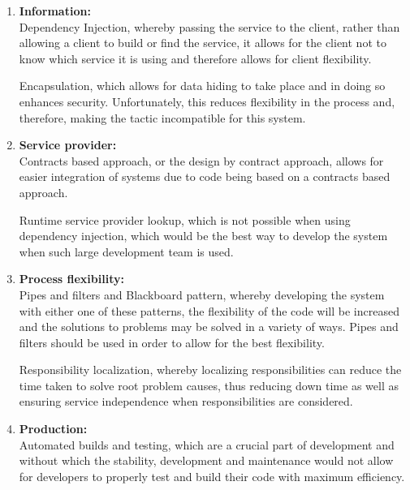 \documentclass{article}
\begin{document}
			\begin{enumerate}

				\item{\bfseries Information:}\\

				Dependency Injection, whereby passing the service to the client, rather than allowing a client to build or find the service, it allows for the client not to know which service it is using and therefore allows for client flexibility.

				Encapsulation, which allows for data hiding to take place and in doing so enhances security. Unfortunately, this reduces flexibility in the process and, therefore, making the tactic incompatible for this system. 

				\item{\bfseries Service provider:}\\

				Contracts based approach, or the design by contract approach, allows for easier integration of systems due to code being based on a contracts based approach.

				Runtime service provider lookup, which is not possible when using dependency injection, which would be the best way to develop the system when such large development team is used.

				\item{\bfseries Process flexibility:}\\

				Pipes and filters and Blackboard pattern, whereby developing the system with either one of these patterns, the flexibility of the code will be increased and the solutions to problems may be solved in a variety of ways. Pipes and filters should be used in order to allow for the best flexibility.

				Responsibility localization, whereby localizing responsibilities can reduce the time taken to solve root problem causes, thus reducing down time as well as ensuring service independence when responsibilities are considered.

				\item{\bfseries Production:}\\

				Automated builds and testing, which are a crucial part of development and without which the stability, development and maintenance would not allow for developers to properly test and build their code with maximum efficiency.

			\end{enumerate}
\end{document}
